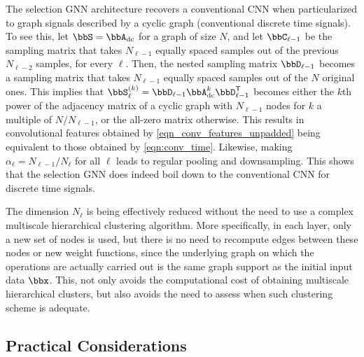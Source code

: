 \begin{remark}\normalfont
The selection GNN architecture recovers a conventional CNN when particularized to graph signals described by a cyclic graph (conventional discrete time signals). To see this, let $\bbS=\bbA_{\dc}$ for a graph of size $N$, and let $\bbC_{\ell-1}$ be the sampling matrix that takes $N_{\ell-1}$ equally spaced samples out of the previous $N_{\ell-2}$ samples, for every $\ell$. Then, the nested sampling matrix $\bbD_{\ell-1}$ becomes a sampling matrix that takes $N_{\ell-1}$ equally spaced samples out of the $N$ original ones. This implies that $\bbS_{\ell}^{(k)} = \bbD_{\ell-1} \bbA_{\dc}^{k} \bbD_{\ell-1}^{\Tr}$ becomes either the $k$th power of the adjacency matrix of a cyclic graph with $N_{\ell-1}$ nodes for $k$ a multiple of $N/N_{\ell-1}$, or the all-zero matrix otherwise. This results in convolutional features obtained by \eqref{eqn_conv_features_unpadded} being equivalent to those obtained by \eqref{eqn:conv_time}. Likewise, making $\alpha_{\ell}=N_{\ell-1}/N_{\ell}$ for all $\ell$ leads to regular pooling and downsampling. This shows that the selection GNN does indeed boil down to the conventional CNN for discrete time signals.
\end{remark}


\begin{remark}\normalfont
The dimension $N_{\ell}$ is being effectively reduced without the need to use a complex multiscale hierarchical clustering algorithm. More specifically, in each layer, only a new set of nodes is used, but there is no need to recompute edges between these nodes or new weight functions, since the underlying graph on which the operations are actually carried out is the same graph support as the initial input data $\bbx$. This, not only avoids the computational cost of obtaining multiscale hierarchical clusters, but also avoids the need to assess when such clustering scheme is adequate.
\end{remark}

%
\subsection{Practical Considerations} \label{subsec_selection_practical}

